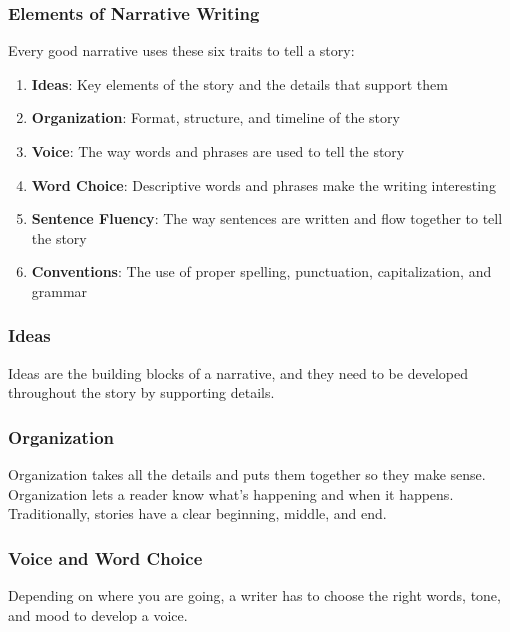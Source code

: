 
\subsubsection*{Elements of Narrative Writing}

Every good narrative uses these six traits to tell a story:

\begin{enumerate}
    \item \textbf{Ideas}: Key elements of the story and the details that support them
    \item \textbf{Organization}: Format, structure, and timeline of the story
    \item \textbf{Voice}: The way words and phrases are used to tell the story
    \item \textbf{Word Choice}: Descriptive words and phrases make the writing interesting
    \item \textbf{Sentence Fluency}: The way sentences are written and flow together to tell the story
    \item \textbf{Conventions}: The use of proper spelling, punctuation, capitalization, and grammar
\end{enumerate}

\subsubsection*{Ideas}

Ideas are the building blocks of a narrative, and they need to be developed throughout the story by supporting details.

\subsubsection*{Organization}

Organization takes all the details and puts them together so they make sense. Organization lets a reader know what's happening and when it
happens. Traditionally, stories have a clear beginning, middle, and end.

\subsubsection*{Voice and Word Choice}

Depending on where you are going, a writer has to choose the right words, tone, and mood to develop a voice.

